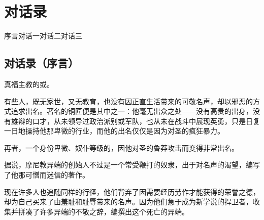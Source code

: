 
\chapter{对话录}


\par

序言\newline{}对话一\newline{}对话二\newline{}对话三\par



\section{对话录（序言）}

真福主教的或。\par

有些人，既无家世，又无教育，也没有因正直生活带来的可敬名声，却以邪恶的方式追求出名。\newline{}著名的铜匠便是其中之一：他毫无出众之处——没有高贵的出身，没有雄辩的口才，从未领导过政治派别或军队，也从未在战斗中展现英勇，只是日复一日地操持他那卑微的行业，而他的出名仅仅是因为对圣的疯狂暴力。\par

再者，一个身份卑微、奴仆等级的，因他对圣的鲁莽攻击而变得非常出名。\par

据说，摩尼教异端的创始人不过是一个常受鞭打的奴隶，出于对名声的渴望，编写了他那可憎而迷信的著作。\par

现在许多人也追随同样的行径，他们背弃了因需要经历劳作才能获得的荣誉之德，却为自己买来了由羞耻和耻辱带来的名声。因为他们急于成为新学说的捍卫者，收集并拼凑了许多异端的不敬之辞，编撰出这个死亡的异端。\par

